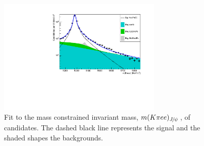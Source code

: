 
\begin{figure}[h!]
\centering
\includegraphics[width=0.7\textwidth]{RKst/figs/Fit/fit_EE/fit_JPs_L_log.pdf}
\caption{Fit to the mass constrained invariant mass, $\mKpiee_{\jpsi}$, of \BdToKstJPsee candidates.
The dashed black line represents the signal and the shaded shapes the backgrounds.}
\label{fig:fitJPsEE}
\end{figure}


